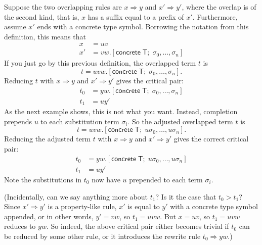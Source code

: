 \documentclass[a4paper,headsepline,bibliography=totoc,toc=flat,fleqn,twoside=semi]{scrbook}
\theoremstyle{definition}
\theoremstyle{definition}
\theoremstyle{definition}
\newcommand{\namesym}[1]{\mathsf{#1}}
\newcommand{\concretesym}[1]{[\mathsf{concrete}\;#1]}
\begin{document}
Suppose the two overlapping rules are $x\Rightarrow y$ and $x'\Rightarrow y'$, where the overlap is of the second kind, that is, $x$ has a suffix equal to a prefix of $x'$. Furthermore, assume $x'$ ends with a concrete type symbol. Borrowing the notation from this definition, this means that
\begin{align*}
x&=uv\\
x'&=vw.\concretesym{\namesym{T};\;\sigma_0,\ldots,\sigma_n}
\end{align*}
If you just go by this previous definition, the overlapped term $t$ is
\[t=uvw.\concretesym{\namesym{T};\;\sigma_0,\ldots,\sigma_n}.\]
Reducing $t$ with $x\Rightarrow y$ and $x'\Rightarrow y'$ gives the critical pair:
\begin{align*}
t_0&=yw.\concretesym{\namesym{T};\;\sigma_0,\ldots,\sigma_n}\\
t_1&=uy'
\end{align*}
As the next example shows, this is not what you want. Instead, completion prepends $u$ to each substitution term $\sigma_i$. So the adjusted overlapped term $t$ is
\[t=uvw.\concretesym{\namesym{T};\;u\sigma_0,\ldots,u\sigma_n}.\]
Reducing the adjusted term $t$ with $x\Rightarrow y$ and $x'\Rightarrow y'$ gives the correct critical pair:
\begin{align*}
t_0&=yw.\concretesym{\namesym{T};\;u\sigma_0,\ldots,u\sigma_n}\\
t_1&=uy'
\end{align*}
Note the substitutions in $t_0$ now have $u$ prepended to each term $\sigma_i$.

(Incidentally, can we say anything more about $t_1$? Is it the case that $t_0>t_1$? Since $x'\Rightarrow y'$ is a property-like rule, $x'$ is equal to $y'$ with a concrete type symbol appended, or in other words, $y'=vw$, so $t_1=uvw$. But $x=uv$, so $t_1=uvw$ reduces to $yw$. So indeed, the above critical pair either becomes trivial if $t_0$ can be reduced by some other rule, or it introduces the rewrite rule $t_0\Rightarrow yw$.)
\end{document}
